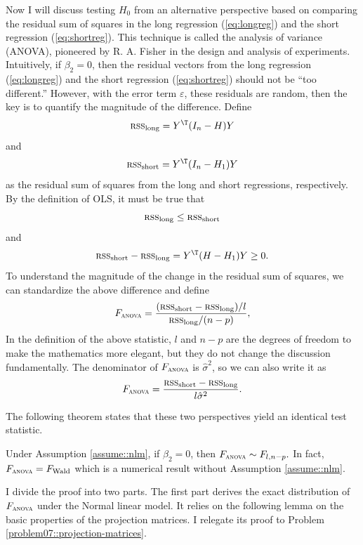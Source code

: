Now I will discuss testing  $H_{0}$ from an alternative perspective based on comparing the residual sum of squares in the long regression (\ref{eq:longreg}) and the short regression (\ref{eq:shortreg}). This technique is called the analysis of variance (ANOVA), pioneered by R. A. Fisher in the design and analysis of experiments. Intuitively, if $\beta_{2}=0$, then the residual vectors from the long regression (\ref{eq:longreg})
and the short regression (\ref{eq:shortreg}) should not be ``too
different.'' However, with the error term $\varepsilon$, these residuals are
random, then the key is to quantify the magnitude of the difference.
Define 
\[
\textsc{rss}_{\text{long}}=Y^{\T}(I_{n}-H)Y
\]
and 
\[
\textsc{rss}_{\text{short}}=Y^{\T}(I_{n}-H_{1})Y
\]
as the residual sum of squares from the long and short regressions,
respectively. By the definition of OLS, it must be true that
$$
\textsc{rss}_{\text{long}}\leq\textsc{rss}_{\text{short}} 
$$
and
\begin{equation}
\textsc{rss}_{\text{short}}-\textsc{rss}_{\text{long}}
=Y^{\T}(H-H_{1})Y
\geq 0.\label{eq:diffvar}
\end{equation}
To understand the magnitude of the change in the residual sum of squares,
we can standardize the above difference and define
\[
F_\textsc{anova} = \frac{(\textsc{rss}_{\text{short}}-\textsc{rss}_{\text{long}})/l}{\textsc{rss}_{\text{long}}/(n-p)},
\]
In the definition of the above statistic, $l$ and $n-p$ are the
degrees of freedom to make the mathematics more elegant, but
they do not change the discussion fundamentally. The denominator of $F_\textsc{anova} $
is $\hat{\sigma}^{2}$, so we can also write it as 
\begin{equation}
F_\textsc{anova} =\frac{\textsc{rss}_{\text{short}}-\textsc{rss}_{\text{long}}}{l\hat{\sigma}^{2}}.\label{eq:Fformula}
\end{equation}


The following theorem states that these two perspectives yield an identical test statistic. 


\begin{theorem}\label{thm::f-two-proofs}
Under Assumption \ref{assume::nlm}, if $\beta_{2}=0$, then $F_\textsc{anova} \sim F_{l,n-p}.$
In fact, $F_\textsc{anova} =F_\text{Wald}  $ which is a numerical result without Assumption \ref{assume::nlm}. 
\end{theorem}



I divide the proof into two parts. The first part derives the exact distribution of $F_\textsc{anova}$ under the Normal linear model. It relies on the following lemma on the basic properties of the projection matrices. I relegate its proof to Problem \ref{problem07::projection-matrices}. 

